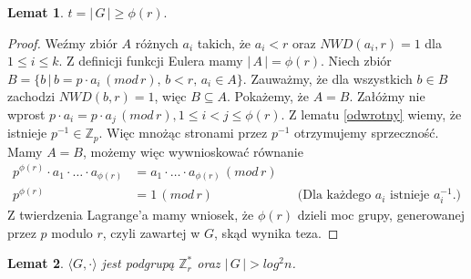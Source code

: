 \documentclass[declaration,shortabstract]{iithesis}
\theoremstyle{definition}
\theoremstyle{remark} \newtheorem{observation}{Obserwacja}
\theoremstyle{plain} \newtheorem{theorem}{Twierdzenie}
\theoremstyle{plain} \newtheorem{lemma}{Lemat}
\theoremstyle{remark} \newtheorem*{remark*}{Uwaga}
\theoremstyle{reminder} \newtheorem*{reminder*}{Przypomnienie}
\begin{document}
\begin{lemma} \label{phi_r}
	$t = | \, G \, | \geq \phi(r).$
\end{lemma}
	
\begin{proof}
	Weźmy zbiór $A$ różnych $a_i$ takich, że $a_i < r$ oraz $NWD(a_i, r) = 1$ dla ${1 \leq i \leq k}$. Z definicji funkcji Eulera mamy $| \, A \, | = \phi(r)$. Niech zbiór $B = \{b \, | \, b = p \cdot a_i \, (mod \, r), \, b < r, \, a_i \in A\}$. Zauważmy, że dla wszystkich $b \in B$ zachodzi $NWD(b, r) = 1$, więc $B \subseteq A.$ Pokażemy, że $A = B$. Załóżmy nie wprost $p \cdot a_i = p \cdot a_j \, (mod \, r), 1 \leq i < j \leq \phi(r)$. Z lematu \ref{odwrotny} wiemy, że istnieje $p^{-1} \in \mathbb{Z}_p$. Więc mnożąc stronami przez $p^{-1}$ otrzymujemy sprzeczność. \newline
	Mamy $A = B$, możemy więc wywnioskować równanie 
	\begin{align*}
		p^{\phi(r)} \cdot a_1 \cdot \dots \cdot a_{\phi(r)} &= a_1 \cdot \dots \cdot a_{\phi(r)} \, (mod \, r) \\
		p^{\phi(r)} & = 1 \, (mod \, r) &   & \text{(Dla każdego $a_i$ istnieje $a_i^{-1}$.)} 
	\end{align*}
	Z twierdzenia Lagrange'a mamy wniosek, że $\phi(r)$ dzieli moc grupy, generowanej przez $p$ modulo $r$, czyli zawartej w $G$, skąd wynika teza.
\end{proof}

\begin{lemma}\label{el_odwr}
	$\langle G, \cdot \rangle$ jest podgrupą $\mathbb{Z}_r^*$ oraz $|\,G\,| > log^2n$.
\end{lemma}
	
\end{document}
